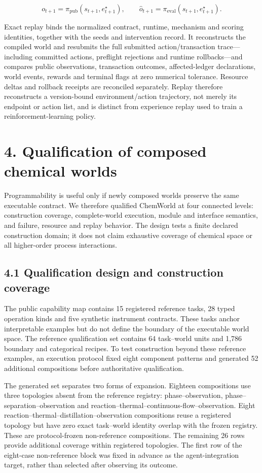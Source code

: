 \documentclass[10pt,twocolumn]{article}
\begin{document}
\[
o_{t+1}=\pi_{\mathrm{pub}}(s_{t+1},e^\star_{t+1}),\qquad
\hat{o}_{t+1}=\pi_{\mathrm{eval}}(s_{t+1},e^\star_{t+1}).
\]

Exact replay binds the normalized contract, runtime, mechanism and
scoring identities, together with the seeds and intervention record. It
reconstructs the compiled world and resubmits the full submitted
action/transaction trace---including committed actions, preflight
rejections and runtime rollbacks---and compares public observations,
transaction outcomes, affected-ledger declarations, world events,
rewards and terminal flags at zero numerical tolerance. Resource deltas
and rollback receipts are reconciled separately. Replay therefore
reconstructs a version-bound environment/action trajectory, not merely
its endpoint or action list, and is distinct from experience replay used
to train a reinforcement-learning policy.

\section{4. Qualification of composed chemical
worlds}\label{qualification-of-composed-chemical-worlds}

Programmability is useful only if newly composed worlds preserve the
same executable contract. We therefore qualified ChemWorld at four
connected levels: construction coverage, complete-world execution,
module and interface semantics, and failure, resource and replay
behavior. The design tests a finite declared construction domain; it
does not claim exhaustive coverage of chemical space or all higher-order
process interactions.

\subsection{4.1 Qualification design and construction
coverage}\label{qualification-design-and-construction-coverage}

The public capability map contains 15 registered reference tasks, 28
typed operation kinds and five synthetic instrument contracts. These
tasks anchor interpretable examples but do not define the boundary of
the executable world space. The reference qualification set contains 64
task--world units and 1,786 boundary and categorical recipes. To test
construction beyond these reference examples, an execution protocol
fixed eight component patterns and generated 52 additional compositions
before authoritative qualification.

The generated set separates two forms of expansion. Eighteen
compositions use three topologies absent from the reference registry:
phase--observation, phase--separation--observation and
reaction--thermal--continuous-flow--observation. Eight
reaction--thermal--distillation--observation compositions reuse a
registered topology but have zero exact task--world identity overlap
with the frozen registry. These are protocol-frozen non-reference
compositions. The remaining 26 rows provide additional coverage within
registered topologies. The first row of the eight-case non-reference
block was fixed in advance as the agent-integration target, rather than
selected after observing its outcome.
\end{document}

